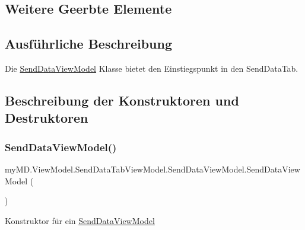 \subsection*{Weitere Geerbte Elemente}


\subsection{Ausführliche Beschreibung}
Die \mbox{\hyperlink{classmy_m_d_1_1_view_model_1_1_send_data_tab_view_model_1_1_send_data_view_model}{Send\+Data\+View\+Model}} Klasse bietet den Einstiegspunkt in den Send\+Data\+Tab. 



\subsection{Beschreibung der Konstruktoren und Destruktoren}
\mbox{\label{classmy_m_d_1_1_view_model_1_1_send_data_tab_view_model_1_1_send_data_view_model_abdf1a8159aac4d3f726a307fc37ca6b6}} 
\subsubsection{\texorpdfstring{Send\+Data\+View\+Model()}{SendDataViewModel()}}
{\footnotesize\ttfamily my\+M\+D.\+View\+Model.\+Send\+Data\+Tab\+View\+Model.\+Send\+Data\+View\+Model.\+Send\+Data\+View\+Model (\begin{DoxyParamCaption}{ }\end{DoxyParamCaption})}



Konstruktor für ein \mbox{\hyperlink{classmy_m_d_1_1_view_model_1_1_send_data_tab_view_model_1_1_send_data_view_model}{Send\+Data\+View\+Model}} 



